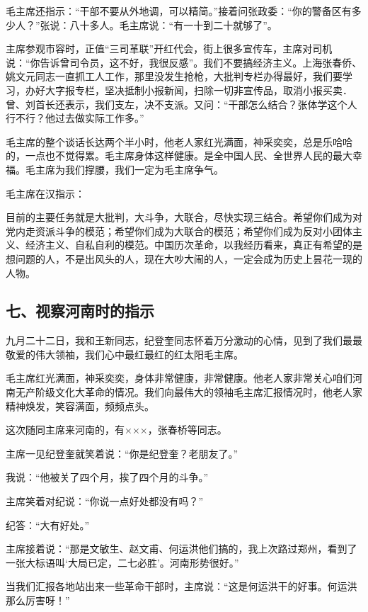 {毛主席还指示：“干部不要从外地调，可以精简。”接着问张政委：“你的警备区有多少人？”张说：八十多人。毛主席说：“有一十到二十就够了”。

主席参观市容时，正值“三司革联”开红代会，街上很多宣传车，主席对司机说：“你告诉曾司令员，这不好，我很反感”。我们不要搞经济主义。上海张春侨、姚文元同志一直抓工人工作，那里没发生抢枪，大批判专栏办得最好，我们要学习，办好大字报专栏，坚决抵制小报新闻，扫除一切非宣传品，取消小报买卖．曾、刘首长还表示，我们支左，决不支派。又问：“干部怎么结合？张体学这个人行不行？他过去做实际工作多。”

毛主席的整个谈话长达两个半小时，他老人家红光满面，神采奕奕，总是乐哈哈的，一点也不觉得累。毛主席身体这样健康。是全中国人民、全世界人民的最大幸福。毛主席为我们撑腰，我们一定为毛主席争气。


毛主席在汉指示：

目前的主要任务就是大批判，大斗争，大联合，尽快实现三结合。希望你们成为对党内走资派斗争的模范；希望你们成为大联合的模范；希望你们成为反对小团体主义、经济主义、自私自利的模范。中国历次革命，以我经历看来，真正有希望的是想问题的人，不是出风头的人，现在大吵大闹的人，一定会成为历史上昙花一现的人物。

\subsection{七、视察河南时的指示}

九月二十二日，我和王新同志，纪登奎同志怀着万分激动的心情，见到了我们最最敬爱的伟大领袖，我们心中最红最红的红太阳毛主席。

毛主席红光满面，神采奕奕，身体非常健康，非常健康。他老人家非常关心咱们河南无产阶级文化大革命的情况。我们向最伟大的领袖毛主席汇报情况时，他老人家精神焕发，笑容满面，频频点头。

这次随同主席来河南的，有×××，张春桥等同志。

主席一见纪登奎就笑着说：“你是纪登奎？老朋友了。”

我说：“他被关了四个月，挨了四个月的斗争。”

主席笑着对纪说：“你说一点好处都没有吗？”

纪答：“大有好处。”

主席接着说：“那是文敏生、赵文甫、何运洪他们搞的，我上次路过郑州，看到了一张大标语叫‘大局已定，二七必胜’。河南形势很好。”

当我们汇报各地站出来一些革命干部时，主席说：“这是何运洪干的好事。何运洪那么厉害呀！”

}

